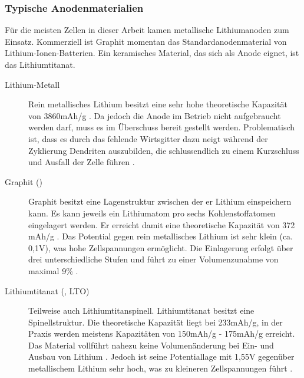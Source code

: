 \documentclass[a4paper, 11pt, headsepline,footsepline,twoside,abstract]{scrbook}
\begin{document}
\subsubsection{Typische Anodenmaterialien}
Für die meisten Zellen in dieser Arbeit kamen metallische Lithiumanoden zum Einsatz. Kommerziell ist Graphit momentan das Standardanodenmaterial von Lithium-Ionen-Batterien. Ein keramisches Material, das sich als Anode eignet, ist das Lithiumtitanat.
\begin{description}
\item[Lithium-Metall] Rein metallisches Lithium besitzt eine sehr hohe theoretische Kapazität von 3860mAh/g \cite{jossen_2006}. Da jedoch die Anode im Betrieb nicht aufgebraucht werden darf, muss es im Überschuss bereit gestellt werden. Problematisch ist, dass es durch das fehlende Wirtsgitter dazu neigt während der Zyklierung Dendriten auszubilden, die schlussendlich zu einem Kurzschluss und Ausfall der Zelle führen \cite{aurbach2002short}. 
\item[Graphit ()] Graphit besitzt eine Lagenstruktur zwischen der er Lithium einspeichern kann. Es kann jeweils ein Lithiumatom pro sechs Kohlenstoffatomen eingelagert werden. Er erreicht damit eine theoretische Kapazität von 372 mAh/g \cite{delasCasas201274}. Das Potential gegen rein metallisches Lithium ist sehr klein (ca. 0,1V), was hohe Zellspannungen ermöglicht. Die Einlagerung erfolgt über drei unterschiedliche Stufen und führt zu einer Volumenzunahme von maximal 9\% \cite{bub_skript}.
\item[Lithiumtitanat (, LTO)] Teilweise auch Lithiumtitanspinell. Lithiumtitanat besitzt eine Spinellstruktur. Die theoretische Kapazität liegt bei 233mAh/g, in der Praxis werden meistens Kapazitäten von 150mAh/g - 175mAh/g erreicht. Das Material vollführt nahezu keine Volumenänderung bei Ein- und Ausbau von Lithium \cite{huang2007effects}. Jedoch ist seine Potentiallage mit 1,55V gegenüber metallischem Lithium sehr hoch, was zu kleineren Zellspannungen führt \cite{hong2010effect}.
\end{description}
\end{document}
